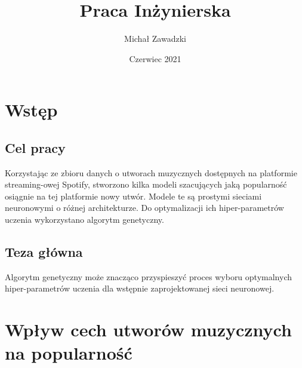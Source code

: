 \documentclass[a4paper,11pt]{article}
\title{Praca Inżynierska}
\author{Michał Zawadzki}
\date{Czerwiec 2021}
\begin{document}
    \maketitle

    \tableofcontents


    \section{Wstęp}

    \subsection{Cel pracy}
    Korzystając ze zbioru danych o utworach muzycznych dostępnych na platformie streaming-owej Spotify, stworzono kilka modeli szacujących jaką popularność osiągnie na tej platformie nowy utwór. Modele te są prostymi sieciami neuronowymi o różnej architekturze. Do optymalizacji ich hiper-parametrów uczenia wykorzystano algorytm genetyczny.

    \subsection{Teza główna}
    Algorytm genetyczny może znacząco przyspieszyć proces wyboru optymalnych hiper-parametrów uczenia dla wstępnie zaprojektowanej sieci neuronowej.


    \section{Wpływ cech utworów muzycznych na popularność}
\end{document}
